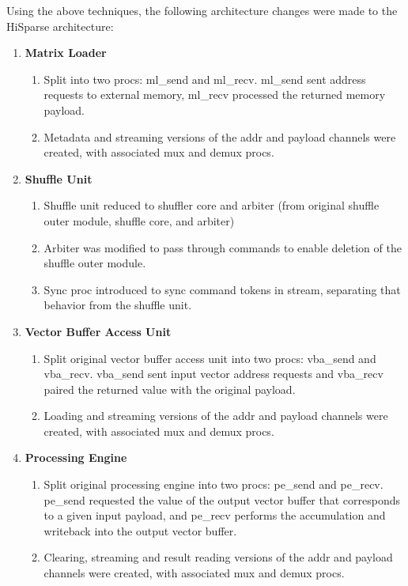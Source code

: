 Using the above techniques, the following architecture changes were made to the HiSparse architecture:
\\
\begin{enumerate}
    \item \textbf{Matrix Loader}
    \begin{enumerate}
        \item Split into two procs: ml\_send and ml\_recv. ml\_send sent address requests to external memory, ml\_recv processed the returned memory payload.
        \item Metadata and streaming versions of the addr and payload channels were created, with associated mux and demux procs.
    \end{enumerate}
    \item \textbf{Shuffle Unit}
    \begin{enumerate}
        \item Shuffle unit reduced to shuffler core and arbiter (from original shuffle outer module, shuffle core, and arbiter)
        \item Arbiter was modified to pass through commands to enable deletion of the shuffle outer module.
        \item Sync proc introduced to sync command tokens in stream, separating that behavior from the shuffle unit.
    \end{enumerate}
    \item \textbf{Vector Buffer Access Unit}
    \begin{enumerate}
        \item Split original vector buffer access unit into two procs: vba\_send and vba\_recv. vba\_send sent input vector address requests and vba\_recv paired the returned value with the original payload.
        \item Loading and streaming versions of the addr and payload channels were created, with associated mux and demux procs.
    \end{enumerate}
    \item \textbf{Processing Engine}
    \begin{enumerate}
        \item Split original processing engine into two procs: pe\_send and pe\_recv. pe\_send requested the value of the output vector buffer that corresponds to a given input payload, and pe\_recv performs the accumulation and writeback into the output vector buffer.
        \item Clearing, streaming and result reading versions of the addr and payload channels were created, with associated mux and demux procs.
    \end{enumerate}
\end{enumerate}